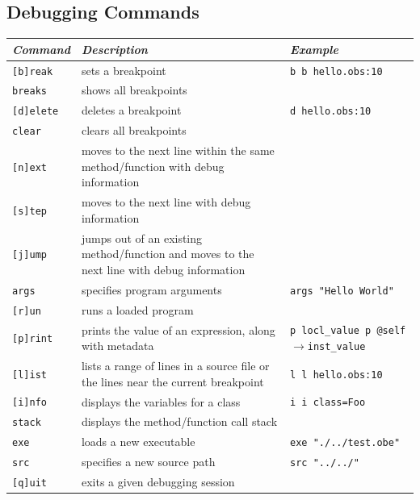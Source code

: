 \documentclass[11pt]{article}
\begin{document}
\subsection{Debugging Commands}
\begin{center}
  \begin{tabular}{| l |p{4 cm} |p{4 cm} |}
    \hline
    \emph{Command} & \emph{Description} & \emph{Example} \\ \hline \hline
    \texttt{[b]reak} &  sets a breakpoint & \texttt{b \newline b hello.obs:10} \\ \hline
    \texttt{breaks} &  shows all breakpoints &  \\ \hline
    \texttt{[d]elete} &  deletes a breakpoint & \texttt{d hello.obs:10} \\ \hline
    \texttt{clear} &  clears all breakpoints &  \\ \hline
    \texttt{[n]ext} &  moves to the next line within the same
    method/function with debug information & \\ \hline
    \texttt{[s]tep} &  moves to the next line with debug information &  \\ \hline
    \texttt{[j]ump} &  jumps out of an existing method/function and moves to the next line with debug information &  \\ \hline
    \texttt{args} &  specifies program arguments & \texttt{args "Hello World"} \\ \hline
    \texttt{[r]un} &  runs a loaded program &  \\ \hline
    \texttt{[p]rint} &  prints the value of an expression, along with
    metadata & \texttt{p locl\_value \newline p @self$\rightarrow$inst\_value} \\ \hline
    \texttt{[l]ist} &  lists a range of lines in a source file or the
    lines near the current breakpoint & \texttt{l \newline l hello.obs:10} \\ \hline
    \texttt{[i]nfo} &  displays the variables for a class & \texttt{i
      \newline i class=Foo} \\ \hline
    \texttt{stack} &  displays the method/function call stack &  \\ \hline
    \texttt{exe} &  loads a new executable & \texttt{exe "./../test.obe"} \\ \hline
    \texttt{src} &  specifies a new source path & \texttt{src "../../"} \\ \hline
    \texttt{[q]uit} &  exits a given debugging session &  \\ \hline
  \end{tabular}
\end{center}
\end{document}
